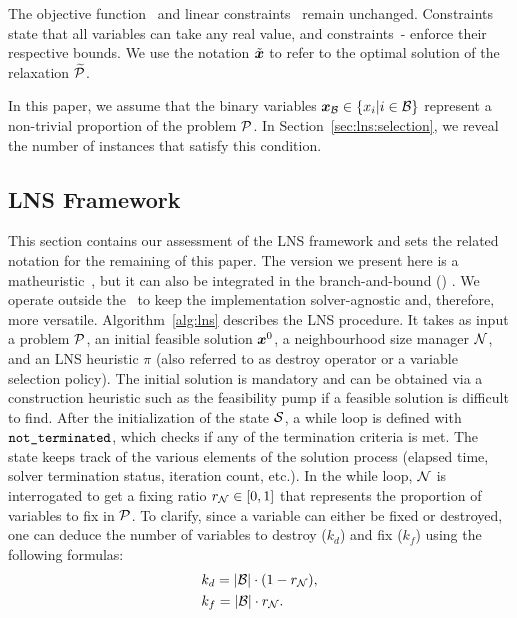 \documentclass[3p, authoryear, times]{elsarticle}
\begin{document}
The objective function~ and linear constraints~ remain unchanged. Constraints~ state that all variables can take any real value, and constraints~- enforce their respective bounds. We use the notation $\xblin$ to refer to the optimal solution of the relaxation $\Plin$. 

In this paper, we assume that the binary variables $\xbbin \in \{x_i| i \in \setbin\}$ represent a non-trivial proportion of the problem $\P$. In Section~\ref{sec:lns:selection}, we reveal the number of instances that satisfy this condition.  


\subsection{LNS Framework}
This section contains our assessment of the LNS framework and sets the related notation for the remaining of this paper. The version we present here is a matheuristic~\citep{fischetti_matheuristics_2018}, but it can also be integrated in the branch-and-bound (\bnb) \citep{hendel_adaptive_2022}. We operate outside the \bnb\ to keep the implementation solver-agnostic and, therefore, more versatile. Algorithm~\ref{alg:lns} describes the LNS procedure. It takes as input a problem $\P$, an initial feasible solution $\xb^0$, a neighbourhood size manager $\nsm$, and an LNS heuristic $\pi$ (also referred to as destroy operator or a variable selection policy). The initial solution is mandatory and can be obtained via a construction heuristic such as the feasibility pump \citep{fischetti_feasibility_2005, bertacco_feasibility_2007} if a feasible solution is difficult to find. After the initialization of the state $\state$, a while loop is defined with $\varname{not_terminated}$, which checks if any of the termination criteria is met. The state keeps track of the various elements of the solution process (elapsed time, solver termination status, iteration count, etc.). In the while loop, $\nsm$ is interrogated to get a fixing ratio $\fixingratio \in [0, 1]$ that represents the proportion of variables to fix in $\P$. To clarify, since a variable can either be fixed or destroyed, one can deduce the number of variables to destroy ($k_d$) and fix ($k_f$) using the following formulas: 
\begin{align}
    &k_d = |\setbin| \cdot (1 - \fixingratio),  \label{eq:lns:fixing} \\
    &k_f = |\setbin| \cdot  \fixingratio. 
\end{align}
\end{document}
